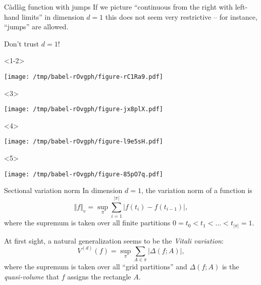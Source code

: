 \documentclass[smaller]{beamer}\usepackage{listings}
\begin{document}
\begin{frame}[label={sec:org02ebd46}]{Càdlàg function with jumps}
If we picture ``continuous from the right with left-hand limits'' in dimension
\(d=1\) this does not seem very restrictive -- for instance, ``jumps'' are allowed.\pause

\begin{alertblock}{\center Don't trust \(d=1\)!}
\end{alertblock}

\begin{onlyenv}<1-2>
\begin{center}
\texttt{[image: /tmp/babel-rOvgph/figure-rC1Ra9.pdf]}
\end{center}
\end{onlyenv}


\begin{onlyenv}<3>
\begin{center}
\texttt{[image: /tmp/babel-rOvgph/figure-jx8plX.pdf]}
\end{center}
\end{onlyenv}

\begin{onlyenv}<4>
\begin{center}
\texttt{[image: /tmp/babel-rOvgph/figure-l9e5sH.pdf]}
\end{center}
\end{onlyenv}

\begin{onlyenv}<5>
\begin{center}
\texttt{[image: /tmp/babel-rOvgph/figure-85pO7q.pdf]}
\end{center}
\end{onlyenv}
\end{frame}

\begin{frame}[label={sec:orge1a67e4}]{Sectional variation norm}
\pause
In dimension $d=1$, the variation norm of a function is
\begin{equation*}
  \Vert f \Vert_{v} = \sup_{\pi} \sum_{i=1}^{|\pi|} |f(t_{i})-f(t_{i-1})|,
\end{equation*}
where the supremum is taken over all finite partitions
\(0=t_0 < t_1 < \dots < t_{|\pi|} = 1\).

\vfill \pause

At first sight, a natural generalization seems to be the \emph{Vitali variation}:
\begin{equation*}
  V^{(d)}(f) = \sup_{\pi} \sum_{A \in \pi} | \Delta(f;A)|,
\end{equation*}
where the supremum is taken over all ``grid partitions'' and \(\Delta(f;A)\) is
the \textit{quasi-volume} that \(f\) assigns the rectangle $A$.
\end{frame}
\end{document}
